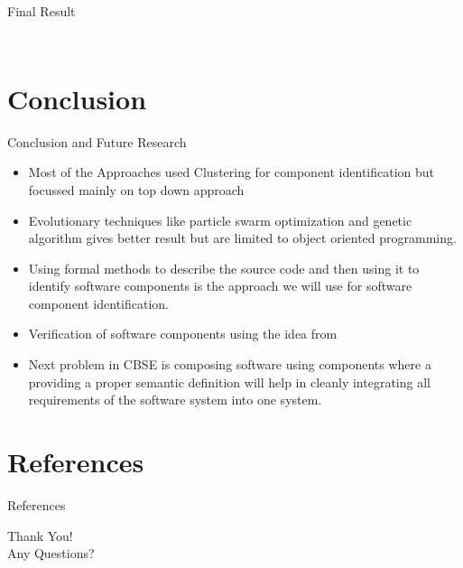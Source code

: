 \documentclass{beamer}
\begin{document}
\begin{frame}{Final Result}
\begin{columns}
\begin{column}{0.5\textwidth}
\begin{figure}
			\end{figure}

		\end{column} 	
	\end{columns}
\end{frame}
\section{Conclusion}
\begin{frame}{Conclusion and Future Research}
	\begin{itemize}
		\item Most of the Approaches used Clustering for component identification but focussed mainly on top down approach
		\item Evolutionary techniques like particle swarm optimization and genetic algorithm gives better result but are limited to object oriented programming.
		\item Using formal methods to describe the source code and then using it to identify software components is the approach we will use for software component identification.
		\item Verification of software components using the idea from \cite{formalVerification}
		\item Next problem in CBSE is composing software using components where a providing a proper semantic definition will help in cleanly integrating all requirements of the software system into one system.
	\end{itemize}
\end{frame}
\section{References}
\begin{frame}[allowframebreaks]{References}
	
	
\end{frame}
\begin{frame}
	\begin{center}
		Thank You!\\
		Any Questions?
	\end{center}
\end{frame}
\end{document}
